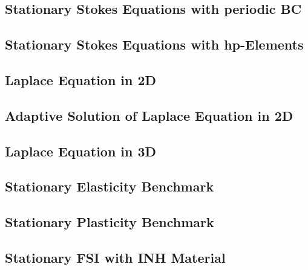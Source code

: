 \documentclass[a4paper,cleardoubleempty]{scrreprt}
\theoremstyle{plain}
\theoremstyle{remark}
\begin{document}
\subsection{Stationary Stokes Equations with periodic BC} 
\label{PDE_Stat_Periodic_Stokes}

\clearpage
\subsection{Stationary Stokes Equations with hp-Elements} 
\label{PDE_Stat_Stokes_hp}

\clearpage
\subsection{Laplace Equation in 2D} 
\label{PDE_Stat_Laplace_2D}

\clearpage
\subsection{Adaptive Solution of Laplace Equation in 2D}
\label{PDE_adap_Stat_Laplace}

\clearpage
\subsection{Laplace Equation in 3D}
\label{PDE_Stat_Laplace_3D}

\clearpage
\subsection{Stationary Elasticity Benchmark} 
\label{PDE_Stat_Elasticity}

\clearpage
\subsection{Stationary Plasticity Benchmark} 
\label{PDE_Stat_Plasticity}

\clearpage
\subsection{Stationary FSI with INH Material} 
\label{PDE_Stat_FSI_INH}

\clearpage
\end{document}

